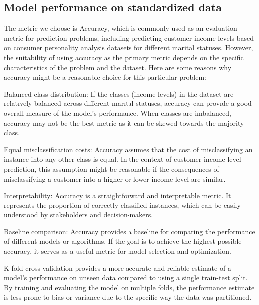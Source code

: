 
\graphicspath{ {../images/} }

\subsection{Model performance on standardized data}

The metric we choose is Accuracy, which is commonly used as an evaluation metric for prediction problems, including predicting customer income levels based on consumer personality analysis datasets for different marital statuses. However, the suitability of using accuracy as the primary metric depends on the specific characteristics of the problem and the dataset. Here are some reasons why accuracy might be a reasonable choice for this particular problem:

Balanced class distribution: If the classes (income levels) in the dataset are relatively balanced across different marital statuses, accuracy can provide a good overall measure of the model's performance. When classes are imbalanced, accuracy may not be the best metric as it can be skewed towards the majority class.

Equal misclassification costs: Accuracy assumes that the cost of misclassifying an instance into any other class is equal. In the context of customer income level prediction, this assumption might be reasonable if the consequences of misclassifying a customer into a higher or lower income level are similar.

Interpretability: Accuracy is a straightforward and interpretable metric. It represents the proportion of correctly classified instances, which can be easily understood by stakeholders and decision-makers.

Baseline comparison: Accuracy provides a baseline for comparing the performance of different models or algorithms. If the goal is to achieve the highest possible accuracy, it serves as a useful metric for model selection and optimization.

K-fold cross-validation provides a more accurate and reliable estimate of a model's performance on unseen data compared to using a single train-test split. By training and evaluating the model on multiple folds, the performance estimate is less prone to bias or variance due to the specific way the data was partitioned.

